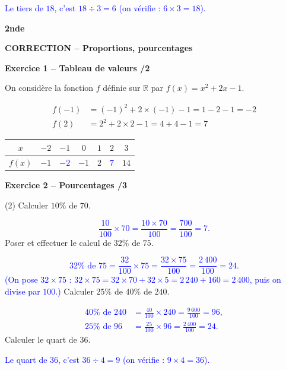 \documentclass[10pt,a4paper]{article}
\renewcommand{\niveau}{2nde}
\renewcommand{\chapitre}{Proportions, pourcentages}
\renewcommand{\interroversion}[1]{
    \noindent\textbf{\niveau}

    \vspace{-0.5cm}
    \begin{center}
        \textbf{\large CORRECTION -- \chapitre}
    \end{center}

    \vspace{0.1cm}
}
\begin{document}
\begin{sujets}
\begin{tasks}
    \textcolor{blue}{Le tiers de \(18\), c'est \(18\div3=6\) (on vérifie : \(6\times3=18\)).}
\end{tasks}

\columnbreak

\interroversion{D}

\textbf{Exercice 1 -- Tableau de valeurs \hfill /2}

On considère la fonction \(f\) définie sur \(\mathbb{R}\) par \(f(x)=x^2+2x-1\).

\[
\begin{aligned}
f(-1) &= (-1)^2+2\times(-1)-1 = 1-2-1 = -2\\
f(2)  &= 2^2+2\times 2-1 = 4+4-1 = 7
\end{aligned}
\]

\begin{center}
    \renewcommand{\arraystretch}{1.5}
    \setlength{\tabcolsep}{0.25cm}
    \begin{tabular}{|*{7}{c|}}
    \hline
    \(x\) & \(-2\) & \(-1\) & \(0\) & \(1\) & \(2\) & \(3\) \\
    \hline
    \(f(x)\) & \(-1\) & \textcolor{blue}{\(-2\)} & \(-1\) & \(2\) & \textcolor{blue}{\(7\)} & \(14\) \\
    \hline
    \end{tabular}
\end{center}

\textbf{Exercice 2 -- Pourcentages \hfill /3}

\begin{tasks}(2)
    \task Calculer \(10\%\) de \(70\).

    \textcolor{blue}{
    \[
    \frac{10}{100}\times 70 = \frac{10\times 70}{100} = \frac{700}{100} = 7.
    \]}
    \task Poser et effectuer le calcul de \(32\%\) de \(75\).

    \textcolor{blue}{
    \[
    32\%\text{ de }75 = \frac{32}{100}\times 75 = \frac{32\times 75}{100} = \frac{2\,400}{100} = 24.
    \]
    (On pose \(32\times75\) : \(32\times75=32\times70+32\times5=2\,240+160=2\,400\), puis on divise par \(100\).)}
    \task Calculer \(25\%\) de \(40\%\) de \(240\).

    \textcolor{blue}{
    \[
    \begin{aligned}
    40\%\text{ de }240 &=\frac{40}{100}\times240=\frac{9\,600}{100}=96,\\
    25\%\text{ de }96 &=\frac{25}{100}\times96=\frac{2\,400}{100}=24.
    \end{aligned}
    \]}
    \task Calculer le quart de \(36\).

    \textcolor{blue}{Le quart de \(36\), c'est \(36\div4=9\) (on vérifie : \(9\times4=36\)).}
\end{tasks}

\end{sujets}
\end{document}
